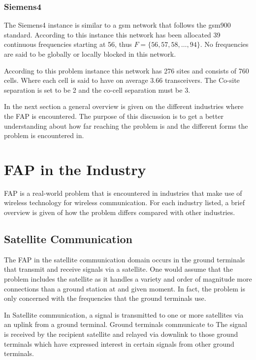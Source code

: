 \subsubsection{Siemens4}
The Siemens4 instance is similar to a \gls{gsm} network that follows the \gls{gsm}900 standard. According to this instance this network has been allocated 39 continuous frequencies starting at 56, thus $F = \{56,57,58,\dots,94\}$. No frequencies are said to be globally or locally blocked in this network.

According to this problem instance this network has 276 sites and consists of 760 cells. Where each cell is said to have on average 3.66 transceivers. The Co-site separation is set to be 2 and the co-cell separation must be 3.

In the next section a general overview is given on the different industries where the \gls{FAP} is encountered. The purpose of this discussion is to get a better understanding about how far reaching the problem is and the different forms the problem is encountered in.
\section{FAP in the Industry}
\label{sec:FAPIndustry}
FAP is a real-world problem that is encountered in industries that make use of wireless technology for wireless communication\cite{Karen2004}. For each industry listed, a brief overview is given of how the problem differs compared with other industries. 

\subsection{Satellite Communication}
The \gls{FAP} in the satellite communication domain occurs in the ground terminals that transmit and receive signals via a satellite\cite{Karen2004}. One would assume that the problem includes the satellite as it handles a variety and order of magnitude more connections than a ground station at and given moment. In fact, the problem is only concerned with the frequencies that the ground terminals use\cite{Karen2004}.

In Satellite communication, a signal is transmitted to one or more satellites via an uplink from a ground terminal\cite{Karen2004}. Ground terminals communicate to  The signal is received by the recipient satellite and relayed via downlink to those ground terminals which have expressed interest in certain signals from other ground terminals\cite{Karen2004}.

